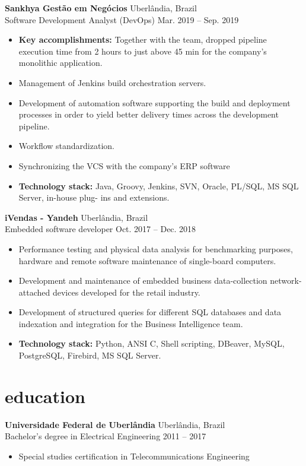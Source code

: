 \documentclass[12pt]{article}
\newcommand{\entry}[4]{{{\textbf{#1}}} \hfill #3 \\ #2 \hfill #4}
\begin{document}
\medskip

\entry{Sankhya Gestão em Negócios}{Software Development Analyst (DevOps)}{Uberlândia, Brazil}{Mar. 2019 -- Sep. 2019}
\begin{itemize}[noitemsep,leftmargin=3.5mm,rightmargin=0mm,topsep=6pt]
  \item \textbf{Key accomplishments:} Together with the team, dropped pipeline execution time from 2 hours to just above 45 min for the company's monolithic application.
  \item Management of Jenkins build orchestration servers.
  \item Development of automation software supporting the build and
  deployment processes in order to yield better delivery times across
  the development pipeline.
  \item Workflow standardization.
  \item Synchronizing the VCS with the company’s ERP software
  \item \textbf{Technology stack:} Java, Groovy, Jenkins, SVN, Oracle, PL/SQL, MS SQL Server, in-house plug-
  ins and extensions.
\end{itemize}

\medskip

\entry{iVendas - Yandeh}{Embedded software developer}{Uberlândia, Brazil}{Oct. 2017 -- Dec. 2018}
\begin{itemize}[noitemsep,leftmargin=3.5mm,rightmargin=0mm,topsep=6pt]
  \item Performance testing and physical data analysis for benchmarking purposes, hardware and
  remote software maintenance of single-board computers.
  \item Development and maintenance of embedded business data-collection network-attached devices
  developed for the retail industry.
  \item Development of structured queries for different SQL databases and data indexation and
  integration for the Business Intelligence team.
  \item \textbf{Technology stack:} Python, ANSI C, Shell scripting, DBeaver, MySQL, PostgreSQL,
  Firebird, MS SQL Server.
\end{itemize}

\section{education}

\entry{Universidade Federal de Uberlândia}{Bachelor’s degree in Electrical Engineering}{Uberlândia, Brazil}{2011 -- 2017}
\begin{itemize}
  \item Special studies certification in Telecommunications Engineering
\end{itemize}


\bigskip

\vspace*{\fill}
\end{document}
